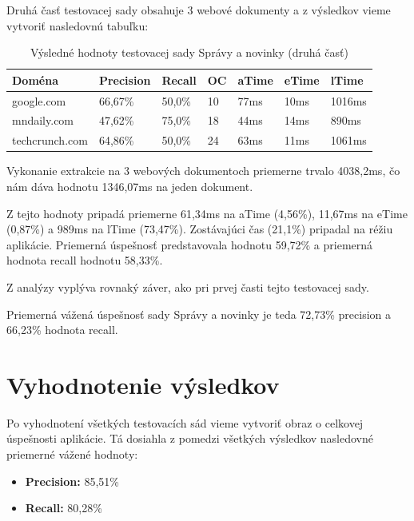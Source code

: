 \newpage

Druhá časť testovacej sady obsahuje 3 webové dokumenty a z výsledkov vieme vytvoriť nasledovnú tabuľku:

\begin{table}[hbt]
\caption{Výsledné hodnoty testovacej sady Správy a novinky (druhá časť)}
\centering
\begin{tabular}{|l|l|l|l|l|l|l|}
\hline
\textbf{Doména}          & \textbf{Precision} & \textbf{Recall}  & \textbf{OC}  & \textbf{aTime} & \textbf{eTime} & \textbf{lTime}  \\ \hline
google.com              & 66,67\%   & 50,0\%  & 10 & 77ms  & 10ms  & 1016ms \\ \hline
mndaily.com             & 47,62\%   & 75,0\%  & 18 & 44ms  & 14ms  & 890ms  \\ \hline
techcrunch.com          & 64,86\%   & 50,0\%  & 24 & 63ms  & 11ms  & 1061ms \\ \hline
\end{tabular}
\end{table}

Vykonanie extrakcie na 3 webových dokumentoch priemerne trvalo 	4038,2ms, čo nám dáva hodnotu 1346,07ms na jeden dokument. 

Z tejto hodnoty pripadá priemerne 61,34ms na aTime (4,56\%), 11,67ms na eTime (0,87\%) a 989ms na lTime (73,47\%). Zostávajúci čas (21,1\%) pripadal na réžiu aplikácie. Priemerná úspešnosť predstavovala hodnotu 59,72\% a priemerná hodnota recall hodnotu 58,33\%. 

\bigskip

Z analýzy vyplýva rovnaký záver, ako pri prvej časti tejto testovacej sady. 

\bigskip

Priemerná vážená úspešnosť sady Správy a novinky je teda 72,73\% precision a 66,23\% hodnota recall.

\section{Vyhodnotenie výsledkov}

Po vyhodnotení všetkých testovacích sád vieme vytvoriť obraz o celkovej úspešnosti aplikácie. Tá dosiahla z pomedzi všetkých výsledkov nasledovné priemerné vážené hodnoty:

\begin{itemize}
    \item \textbf{Precision:} 85,51\%
    \item \textbf{Recall:} 80,28\%
\end{itemize}

